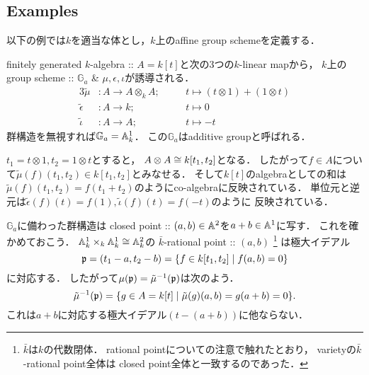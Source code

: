 \documentclass[a4paper]{jsarticle}
\newcommand{\Ga}{\mathbb{G}_a}
\begin{document}
    \subsection{Examples}
    以下の例では$k$を適当な体とし，$k$上のaffine group schemeを定義する．
    \begin{Example}[$\Ga$]
        finitely generated $k$-algebra :: $A=k[t]$と次の3つの$k$-linear mapから，
        $k$上のgroup scheme :: $\Ga$ \& $\mu,\epsilon,\iota$が誘導される．
        \begin{alignat*}{3}
            \tilde{\mu}&:
                A \to A \otimes_k A; &&
                \quad t \mapsto (t \otimes 1)+(1 \otimes t) \\
            \tilde{\epsilon}&:
                A \to k; &&
                \quad t \mapsto 0 \\
            \tilde{\iota}&:
                A \to A; &&
                \quad t \mapsto -t
        \end{alignat*}
        群構造を無視すれば$\Ga=\affine^1_k$．
        この$\Ga$はadditive groupと呼ばれる．

        $t_1=t \otimes 1, t_2=1 \otimes t$とすると，
        $A \otimes A \cong k[t_1,t_2]$となる．
        したがって$f \in A$について$\tilde{\mu}(f)(t_1,t_2) \in k[t_1,t_2]$とみなせる．
        そして$k[t]$のalgebraとしての和は
        $\tilde{\mu}(f)(t_1,t_2)=f(t_1+t_2)$のようにco-algebraに反映されている．
        単位元と逆元は$\tilde{\epsilon}(f)(t)=f(1), \tilde{\iota}(f)(t)=f(-t)$のように
        反映されている．
    
        $\Ga$に備わった群構造は
        closed point :: $(a,b) \in \mathbb{A}^2$を$a+b \in \mathbb{A}^1$に写す．
        これを確かめておこう．
        $\mathbb{A}^1_k \times_k \mathbb{A}^1_k \cong \mathbb{A}^2_k$の
        $\bar{k}$-rational point :: $(a,b)$
        \footnote
        {
            $\bar{k}$は$k$の代数閉体．
            rational pointについての注意で触れたとおり，
            varietyの$\bar{k}$-rational point全体は
            closed point全体と一致するのであった．
        }
        は極大イデアル
        \[ \mathfrak{p}=(t_1-a, t_2-b)=\{ f \in k[t_1,t_2] \mid f(a,b)=0 \} \]に対応する．
        したがって$\mu(\mathfrak{p})=\tilde{\mu}^{-1}(\mathfrak{p})$は次のよう．
        \[ \tilde{\mu}^{-1}(\mathfrak{p})=\{ g \in A=k[t] \mid \tilde{\mu}(g)(a,b)=g(a+b)=0 \}. \]
        これは$a+b$に対応する極大イデアル$(t-(a+b))$に他ならない．
    \end{Example}
\end{document}
